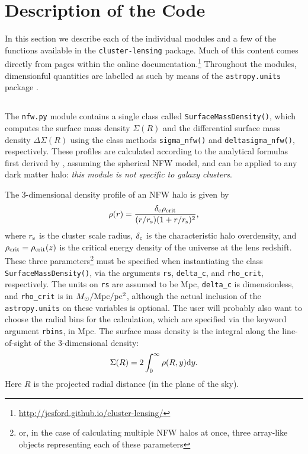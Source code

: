 \documentclass[twocolumn]{aastex6}
\newcommand{\code}{\lstinline[style=codeintext]}
\newcommand{\hcode}{\large\normalfont\texttt} %
\begin{document}

\section{Description of the Code}
\label{code}

In this section we describe each of the individual modules and a few of the functions available in the \code{cluster-lensing} package. Much of this content comes directly from pages within the online documentation.\footnote{\url{http://jesford.github.io/cluster-lensing/}} Throughout the modules, dimensionful quantities are labelled as such by means of the \code{astropy.units} package \citep{astropy13}.


\subsection{\normalfont{\hcode{nfw.py}}}
\label{nfw}

The \code{nfw.py} module contains a single class called \code{SurfaceMassDensity()}, which computes the surface mass density $\Sigma(R)$ and the differential surface mass density $\Delta\Sigma(R)$ using the class methods \code{sigma_nfw()} and \code{deltasigma_nfw()}, respectively. These profiles are calculated according to the analytical formulas first derived by \citet{Wright00}, assuming the spherical NFW model, and can be applied to any dark matter halo: \emph{this module is not specific to galaxy clusters}. 

The 3-dimensional density profile of an NFW halo is given by 
\begin{equation}\label{nfw3d}
\rho(r) = \frac{\delta_{\rm c} \rho_{\rm crit}}{(r/r_{\rm s})(1+r/r_{\rm s})^2},
\end{equation}
where $r_{\rm s}$ is the cluster scale radius, $\delta_{\rm c}$ is the characteristic halo overdensity, and $\rho_{\rm crit} = \rho_{\rm crit}(z)$ is the critical energy density of the universe at the lens redshift. These three parameters\footnote{or, in the case of calculating multiple NFW halos at once, three array-like objects representing each of these parameters} must be specified when instantiating the class \code{SurfaceMassDensity()}, via the arguments \code{rs}, \code{delta_c}, and \code{rho_crit}, respectively. The units on \code{rs} are assumed to be Mpc, \code{delta_c} is dimensionless, and \code{rho_crit} is in $M_{\odot}/{\rm Mpc}/{\rm pc}^2$, although the actual inclusion of the \code{astropy.units} on these variables is optional. The user will probably also want to choose the radial bins for the calculation, which are specified via the keyword argument \code{rbins}, in Mpc. The surface mass density is the integral along the line-of-sight of the 3-dimensional density:
\begin{equation}
\Sigma(R) = 2 \int_0^{\infty} \rho(R,y) {\rm d}y.
\end{equation}
Here $R$ is the projected radial distance (in the plane of the sky).  
\end{document}
